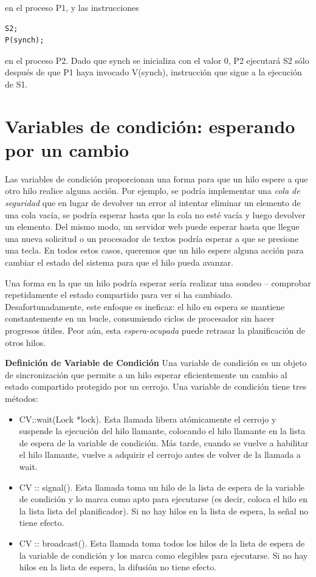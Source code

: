 \documentclass[10pt]{book}
\begin{document}
en el proceso {\mf P1}, y las instrucciones

\begin{lstlisting}
S2;
P(synch);
\end{lstlisting}

en el proceso {\mf P2}. Dado que {\mf synch} se inicializa con el valor 0, {\mf P2} ejecutará {\mf S2} sólo después de que {\mf P1} haya invocado {\mf V(synch)}, instrucción que sigue a la ejecución de {\mf S1}.

\section{Variables de condición: esperando por un cambio}
Las variables de condición proporcionan una forma para que un hilo espere a que otro hilo realice alguna acción. Por ejemplo, se podría implementar una \textit{cola de seguridad} que en lugar de devolver un error al intentar eliminar un elemento de una cola vacía, se podría esperar hasta que la cola no esté vacía y luego devolver un elemento. Del mismo modo, un servidor web puede esperar hasta que llegue una nueva solicitud o un procesador de textos podría esperar a que se presione una tecla. En todos estos casos, queremos que un hilo espere alguna acción para cambiar el estado del sistema para que el hilo pueda avanzar.

Una forma en la que un hilo podría esperar sería realizar una sondeo -- comprobar repetidamente el estado compartido para ver si ha cambiado. Desafortunadamente, este enfoque es ineficaz: el hilo en espera se mantiene constantemente en un bucle, consumiendo ciclos de procesador sin hacer progresos útiles. Peor aún, esta \textit{espera-ocupada} puede retrasar la planificación de otros hilos.

\textbf{Definición de Variable de Condición}
Una variable de condición es un objeto de sincronización que permite a un hilo esperar eficientemente un cambio al estado compartido protegido por un cerrojo. Una variable de condición tiene tres métodos:
\begin{itemize}
\item {\mf CV::wait(Lock *lock)}. Esta llamada libera atómicamente el cerrojo y suspende la ejecución del hilo llamante, colocando el hilo llamante en la lista de espera de la variable de condición. Más tarde, cuando se vuelve a habilitar el hilo llamante, vuelve a adquirir el cerrojo antes de volver de la llamada a {\mf wait}.
\item {\mf CV :: signal()}. Esta llamada toma un hilo de la lista de espera de la variable de condición y lo marca como apto para ejecutarse (es decir, coloca el hilo en la lista lista del planificador). Si no hay hilos en la lista de espera, la señal no tiene efecto.
\item {\mf CV :: broadcast()}. Esta llamada toma todos los hilos de la lista de espera de la variable de condición y los marca como elegibles para ejecutarse. Si no hay hilos en la lista de espera, la difusión no tiene efecto.
\end{itemize}
\end{document}
